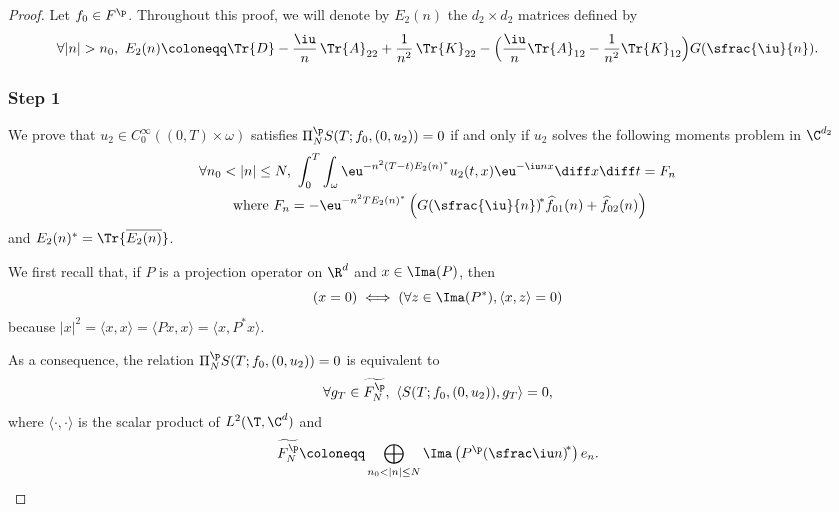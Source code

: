 \begin{proof}
Let $f_0 \in F^\p$. Throughout this proof, we will denote by $E_2(n)$ the $d_2\times d_2$ matrices defined by
\[
\forall |n|>n_0, \ E_2(n)\coloneqq \Tr{D} - \frac{\iu}{n}\, \Tr{A}_{22} + \frac{1}{n^2}\, \Tr{K}_{22} - \Bigl(\frac{\iu}{n} \Tr{A}_{12} - \frac{1}{n^2} \Tr{K}_{12} \Bigr) G(\sfrac{\iu}{n}).
\]

\subsubsection*{Step 1} We prove that $u_2 \in C^\infty_0((0,T)\times\omega)$ satisfies $\Pi^\p_N S(T;f_0,(0,u_2))=0$ if and only if $u_2$ solves the following moments problem in $\C^{d_2}$
\begin{multline} \label{moment}
\forall n_0 < |n| \leq N, \
\int_0^T \int_{\omega} \eu^{-n^2(T-t)E_2(n)^*} u_2(t,x)\eu^{-\iu nx} \diff x \diff t= F_n \\
\text{ where } F_n = - \eu^{-n^2 T E_2(n)^*} \left(G {\left(\sfrac{\iu}{n} \right)\!}^\ast \widehat{f}_{01}(n) + \widehat{f}_{02}(n) \right)
\end{multline}
and $E_2(n)^*=\Tr{\overline{E_2(n)}}$.

We first recall that, if $P$ is a projection operator on $\R^d$ and $x\in\Ima(P)$, then
\[
\left(x=0 \right) \iff \left(\forall z\in\Ima(P^*), \langle x, z \rangle=0 \right)
\]
because $|x|^2 = \langle x, x \rangle = \langle Px, x \rangle = \langle x, P^* x \rangle$.

As a consequence, the relation $\Pi^\p_N S(T;f_0,(0,u_2))=0$ is equivalent to
\begin{equation} \label{NC-p_HF}
\forall g_T \in \widetilde{F^\p_N}, \
\left\langle S(T;f_0,(0,u_2)), g_T \right\rangle = 0,
\end{equation}
where $\langle \cdot, \cdot \rangle$ is the scalar product of $L^2(\T,\C^d)$ and
\[
\widetilde{F^\p_N} \coloneqq \bigoplus\limits_{n_0 < |n| \leq N} \Ima\left(P^\p(\sfrac \iu n{)\!}^\ast\right) e_n.
\]


\end{proof}
